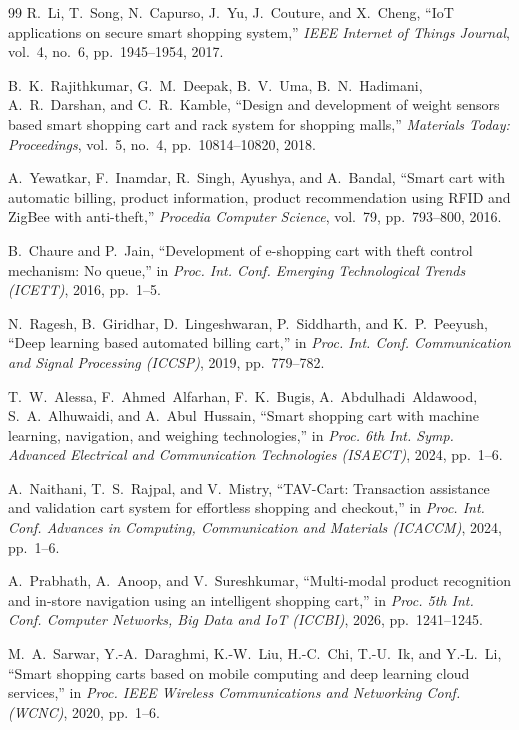 \documentclass[conference]{IEEEtran}
\begin{document}
\begin{thebibliography}{99}
 R.~Li, T.~Song, N.~Capurso, J.~Yu, J.~Couture, and X.~Cheng, ``IoT applications on
secure smart shopping system,'' \emph{IEEE Internet of Things Journal}, vol.~4, no.~6,
pp.~1945--1954, 2017.

 B.~K.~Rajithkumar, G.~M.~Deepak, B.~V.~Uma, B.~N.~Hadimani, A.~R.~Darshan, and
C.~R.~Kamble, ``Design and development of weight sensors based smart shopping cart and rack system for
shopping malls,'' \emph{Materials Today: Proceedings}, vol.~5, no.~4, pp.~10814--10820, 2018.

 A.~Yewatkar, F.~Inamdar, R.~Singh, Ayushya, and A.~Bandal, ``Smart cart with automatic
billing, product information, product recommendation using RFID and ZigBee with anti-theft,''
\emph{Procedia Computer Science}, vol.~79, pp.~793--800, 2016.

 B.~Chaure and P.~Jain, ``Development of e-shopping cart with theft control mechanism: No
queue,'' in \emph{Proc. Int. Conf. Emerging Technological Trends (ICETT)}, 2016, pp.~1--5.

 N.~Ragesh, B.~Giridhar, D.~Lingeshwaran, P.~Siddharth, and K.~P.~Peeyush, ``Deep
learning based automated billing cart,'' in \emph{Proc. Int. Conf. Communication and Signal Processing
(ICCSP)}, 2019, pp.~779--782.

 T.~W.~Alessa, F.~Ahmed~Alfarhan, F.~K.~Bugis, A.~Abdulhadi~Aldawood, S.~A.~Alhuwaidi,
and A.~Abul~Hussain, ``Smart shopping cart with machine learning, navigation, and weighing
technologies,'' in \emph{Proc. 6th Int. Symp. Advanced Electrical and Communication Technologies
(ISAECT)}, 2024, pp.~1--6.

 A.~Naithani, T.~S.~Rajpal, and V.~Mistry, ``TAV-Cart: Transaction assistance and
validation cart system for effortless shopping and checkout,'' in \emph{Proc. Int. Conf. Advances in
Computing, Communication and Materials (ICACCM)}, 2024, pp.~1--6.

 A.~Prabhath, A.~Anoop, and V.~Sureshkumar, ``Multi-modal product recognition and
in-store navigation using an intelligent shopping cart,'' in \emph{Proc. 5th Int. Conf. Computer
Networks, Big Data and IoT (ICCBI)}, 2026, pp.~1241--1245.

 M.~A.~Sarwar, Y.-A.~Daraghmi, K.-W.~Liu, H.-C.~Chi, T.-U.~Ik, and Y.-L.~Li, ``Smart
shopping carts based on mobile computing and deep learning cloud services,'' in \emph{Proc. IEEE
Wireless Communications and Networking Conf. (WCNC)}, 2020, pp.~1--6.


\end{thebibliography}
\end{document}
